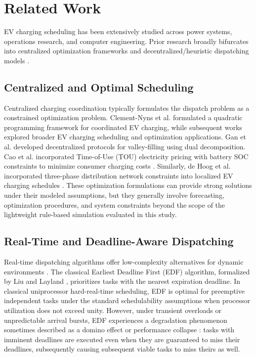 \documentclass[conference]{IEEEtran}
\begin{document}
\section{Related Work}
\label{sec:related}
EV charging scheduling has been extensively studied across power systems, operations research, and computer engineering. Prior research broadly bifurcates into centralized optimization frameworks and decentralized/heuristic dispatching models \cite{mukherjee2014a, alogaili2019review}.

\subsection{Centralized and Optimal Scheduling}
Centralized charging coordination typically formulates the dispatch problem as a constrained optimization problem. Clement-Nyns et al. \cite{clement2010impact} formulated a quadratic programming framework for coordinated EV charging, while subsequent works \cite{mukherjee2014a, alogaili2019review} explored broader EV charging scheduling and optimization applications. Gan et al. \cite{gan2013optimal} developed decentralized protocols for valley-filling using dual decomposition. Cao et al. \cite{cao2012optimized} incorporated Time-of-Use (TOU) electricity pricing with battery SOC constraints to minimize consumer charging costs \cite{zhang2014charging, ortegavazquez2012electric}. Similarly, de Hoog et al. \cite{dehoog2015optimal} incorporated three-phase distribution network constraints into localized EV charging schedules \cite{li2021coordinating}. These optimization formulations can provide strong solutions under their modeled assumptions, but they generally involve forecasting, optimization procedures, and system constraints beyond the scope of the lightweight rule-based simulation evaluated in this study. 

\subsection{Real-Time and Deadline-Aware Dispatching}
Real-time dispatching algorithms offer low-complexity alternatives for dynamic environments \cite{deilami2011realtime, mohamed2013realtime}. The classical Earliest Deadline First (EDF) algorithm, formalized by Liu and Layland \cite{liu1973scheduling}, prioritizes tasks with the nearest expiration deadline. In classical uniprocessor hard-real-time scheduling, EDF is optimal for preemptive independent tasks under the standard schedulability assumptions when processor utilization does not exceed unity. However, under transient overloads or unpredictable arrival bursts, EDF experiences a degradation phenomenon sometimes described as a domino effect or performance collapse \cite{buttazzo2011hard}: tasks with imminent deadlines are executed even when they are guaranteed to miss their deadlines, subsequently causing subsequent viable tasks to miss theirs as well.
\end{document}
